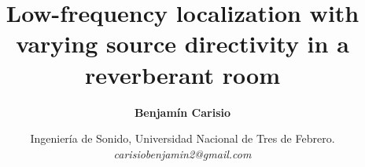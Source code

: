 \documentclass[10pt]{article} %
\begin{document}
\title{\textbf{\Large{Low-frequency localization with varying source directivity in a reverberant room}}}
\author{\textbf{Benjamín Carisio }\vspace{1ex}%
}
\date{\normalsize{Ingeniería de Sonido, Universidad Nacional de Tres de Febrero.}
    \\
    \textit{carisiobenjamin2@gmail.com}\vspace{-1ex}
}

\maketitle

\vspace*{1cm}









\printbibliography[title={\large\textbf{REFERENCES}}]
\end{document}
